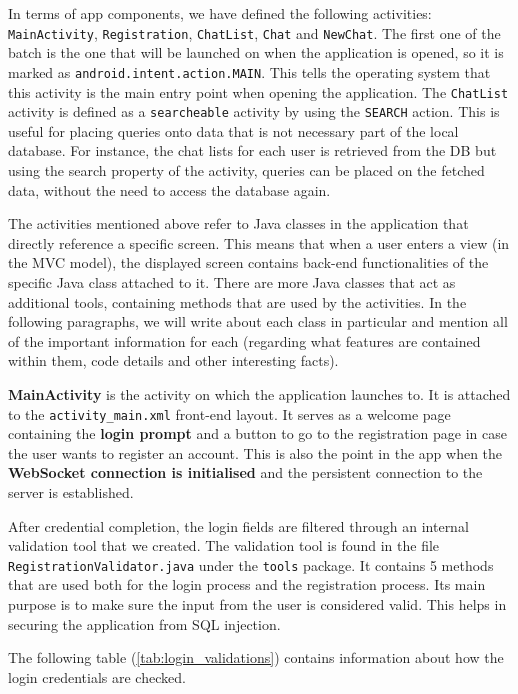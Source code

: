 In terms of app components, we have defined the following activities: \verb|MainActivity|, \verb|Registration|, \verb|ChatList|, \verb|Chat| and \verb|NewChat|. The first one of the batch is the one that will be launched on when the application is opened, so it is marked as \verb|android.intent.action.MAIN|. This tells the operating system that this activity is the main entry point when opening the application. The \verb|ChatList| activity is defined as a \verb|searcheable| activity by using the \verb|SEARCH| action. This is useful for placing queries onto data that is not necessary part of the local database. For instance, the chat lists for each user is retrieved from the DB but using the search property of the activity, queries can be placed on the fetched data, without the need to access the database again.

The activities mentioned above refer to Java classes in the application that directly reference a specific screen. This means that when a user enters a view (in the MVC model), the displayed screen contains back-end functionalities of the specific Java class attached to it. There are more Java classes that act as additional tools, containing methods that are used by the activities. In the following paragraphs, we will write about each class in particular and mention all of the important information for each (regarding what features are contained within them, code details and other interesting facts).

\textbf{MainActivity} is the activity on which the application launches to. It is attached to the \verb|activity_main.xml| front-end layout. It serves as a welcome page containing the \textbf{login prompt} and a button to go to the registration page in case the user wants to register an account. This is also the point in the app when the \textbf{WebSocket connection is initialised} and the persistent connection to the server is established. %

After credential completion, the login fields are filtered through an internal validation tool that we created. The validation tool is found in the file \verb|RegistrationValidator.java| under the \verb|tools| package. It contains 5 methods that are used both for the login process and the registration process. Its main purpose is to make sure the input from the user is considered valid. This helps in securing the application from SQL injection.

The following table (\ref{tab:login_validations}) contains information about how the login credentials are checked.

